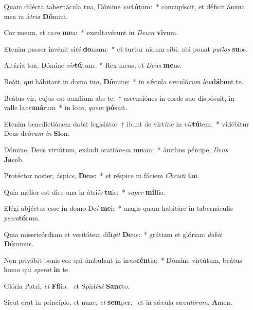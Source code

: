 \item Quam dilécta tabernácula tua, Dómine \textit{vir}\textbf{tú}tum:~* concupíscit, et déficit ánima mea in á\textit{tri}\textit{a} \textbf{Dó}mini.
\item Cor meum, et ca\textit{ro} \textbf{me}a:~* exsultavérunt in \textit{De}\textit{um} \textbf{vi}vum.
\item Etenim passer invénit si\textit{bi} \textbf{do}mum:~* et turtur nidum sibi, ubi ponat \textit{pul}\textit{los} \textbf{su}os.
\item Altária tua, Dómine \textit{vir}\textbf{tú}tum:~* Rex meus, et \textit{De}\textit{us} \textbf{me}us.
\item Beáti, qui hábitant in domo tu\textit{a}, \textbf{Dó}mine:~* in sǽcula sæculó\textit{rum} \textit{lau}\textbf{dá}bunt te.
\item Beátus vir, cujus est auxílium abs te:~† ascensiónes in corde suo dispósuit, in valle la\textit{cri}\textbf{má}rum~* in lo\textit{co}, \textit{quem} \textbf{pó}suit.
\item Etenim benedictiónem dabit legislátor~† ibunt de virtúte in \textit{vir}\textbf{tú}tem:~* vidébitur Deus deó\textit{rum} \textit{in} \textbf{Si}on.
\item Dómine, Deus virtútum, exáudi oratió\textit{nem} \textbf{me}am:~* áuribus pércipe, \textit{De}\textit{us} \textbf{Ja}cob.
\item Protéctor noster, áspi\textit{ce}, \textbf{De}us:~* et réspice in fáciem \textit{Chris}\textit{ti} \textbf{tu}i.
\item Quia mélior est dies una in átri\textit{is} \textbf{tu}is:~* \textit{su}\textit{per} \textbf{míl}lia.
\item Elégi abjéctus esse in domo De\textit{i} \textbf{me}i:~* magis quam habitáre in tabernáculis \textit{pec}\textit{ca}\textbf{tó}rum.
\item Quia misericórdiam et veritátem díli\textit{git} \textbf{De}us:~* grátiam et glóriam \textit{da}\textit{bit} \textbf{Dó}minus.
\item Non privábit bonis eos qui ámbulant in in\textit{no}\textbf{cén}tia:~* Dómine virtútum, beátus homo qui \textit{spe}\textit{rat} \textbf{in} te.
\item Glória Patri, \textit{et} \textbf{Fí}lio,~\psstar{} et Spirí\textit{tu}\textit{i} \textbf{Sanc}to.
\item Sicut erat in princípio, et nunc, \textit{et} \textbf{sem}per,~\psstar{} et in sǽcula sæcu\textit{ló}\textit{rum}. \textbf{A}men.